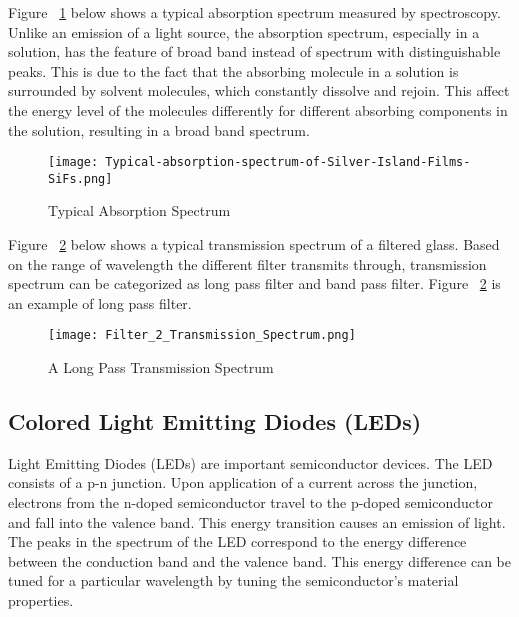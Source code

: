 \documentclass{article}
\begin{document}

Figure ~\ref{fig:Typical Absorption Spectrum} below shows a typical absorption spectrum measured by spectroscopy.  Unlike an emission of a light source, the absorption spectrum, especially in a solution, has the feature of broad band instead of spectrum with distinguishable peaks. This is due to the fact that the absorbing molecule in a solution is surrounded by solvent molecules, which constantly dissolve and rejoin. This affect the energy level of the molecules differently for different absorbing components in the solution, resulting in a broad band spectrum.



\begin{figure}[h!]
    \centering
    \texttt{[image: Typical-absorption-spectrum-of-Silver-Island-Films-SiFs.png]}
    \caption{Typical Absorption Spectrum}
    \label{fig:Typical Absorption Spectrum}
\end{figure}


Figure ~\ref{fig:Longpass} below shows a typical transmission spectrum of a filtered glass. Based on the range of wavelength the different filter transmits through, transmission spectrum can be categorized as long pass filter and band pass filter. Figure ~\ref{fig:Longpass} is an example of long pass filter.

\begin{figure}[h!]
    \centering
    \texttt{[image: Filter\_2\_Transmission\_Spectrum.png]}
    \caption{A Long Pass Transmission Spectrum}
    \label{fig:Longpass}
\end{figure}
\subsection{Colored Light Emitting Diodes (LEDs)}

Light Emitting Diodes (LEDs) are important semiconductor devices. The LED consists of a p-n junction. Upon application of a current across the junction, electrons from the n-doped semiconductor travel to the p-doped semiconductor and fall into the valence band. This energy transition causes an emission of light. The peaks in the spectrum of the LED correspond to the energy difference between the conduction band and the valence band. This energy difference can be tuned for a particular wavelength by tuning the semiconductor's material properties.
\end{document}
